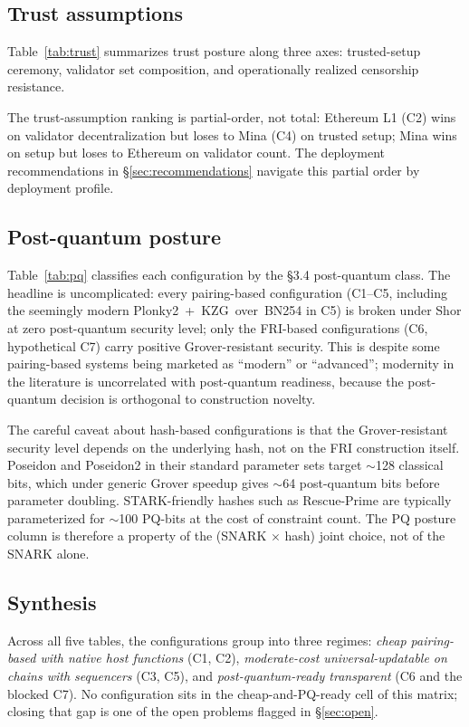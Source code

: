 

\subsection{Trust assumptions}
\label{sec:analysis-trust}

Table~\ref{tab:trust} summarizes trust posture along three axes:
trusted-setup ceremony, validator set composition, and operationally
realized censorship resistance.



The trust-assumption ranking is partial-order, not total: Ethereum L1
(C2) wins on validator decentralization but loses to Mina (C4) on
trusted setup; Mina wins on setup but loses to Ethereum on validator
count. The deployment recommendations in
\S\ref{sec:recommendations} navigate this partial order by deployment
profile.

\subsection{Post-quantum posture}
\label{sec:analysis-pq}

Table~\ref{tab:pq} classifies each configuration by the §3.4
post-quantum class. The headline is uncomplicated: every
pairing-based configuration (C1--C5, including the seemingly modern
Plonky2~+~KZG~over~BN254 in C5) is broken under Shor at zero
post-quantum security level; only the FRI-based configurations
(C6, hypothetical C7) carry positive Grover-resistant security. This
is despite some pairing-based systems being marketed as ``modern'' or
``advanced''; modernity in the literature is uncorrelated with
post-quantum readiness, because the post-quantum decision is
orthogonal to construction novelty.



The careful caveat about hash-based configurations is that the
Grover-resistant security level depends on the underlying hash, not
on the FRI construction itself. Poseidon and Poseidon2 in their
standard parameter sets target $\sim$128 classical bits, which under
generic Grover speedup gives $\sim$64 post-quantum bits before
parameter doubling. STARK-friendly hashes such as Rescue-Prime are
typically parameterized for $\sim$100 PQ-bits at the cost of
constraint count. The PQ posture column is therefore a property of
the (SNARK $\times$ hash) joint choice, not of the SNARK alone.

\subsection{Synthesis}
\label{sec:analysis-synthesis}

Across all five tables, the configurations group into three regimes:
\emph{cheap pairing-based with native host functions} (C1, C2),
\emph{moderate-cost universal-updatable on chains with sequencers}
(C3, C5), and \emph{post-quantum-ready transparent} (C6 and the
blocked C7). No configuration sits in the cheap-and-PQ-ready cell
of this matrix; closing that gap is one of the open problems flagged
in \S\ref{sec:open}.
